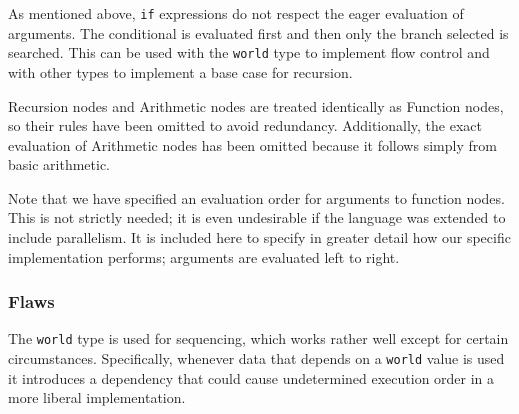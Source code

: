 \documentclass[12pt,UTF8,a4]{article}
\newcommand{\code}[1]{\texttt{#1}}
\newcommand{\type}[1]{\texttt{#1}}
\begin{document}
As mentioned above, \code{if} expressions do not respect the eager
evaluation of arguments. The conditional is evaluated first and then
only the branch selected is searched. This can be used with the
\type{world} type to implement flow control and with other types to
implement a base case for recursion.


Recursion nodes and Arithmetic nodes are treated identically as
Function nodes, so their rules have been omitted to avoid
redundancy. Additionally, the exact evaluation of Arithmetic nodes has
been omitted because it follows simply from basic arithmetic.

Note that we have specified an evaluation order for arguments to
function nodes. This is not strictly needed; it is even undesirable if
the language was extended to include parallelism. It is included here
to specify in greater detail how our specific implementation performs;
arguments are evaluated left to right.

\subsubsection{Flaws}
The \type{world} type is used for sequencing, which works rather well
except for certain circumstances. Specifically, whenever data that
depends on a \type{world} value is used it introduces a dependency
that could cause undetermined execution order in a more liberal
implementation.
\end{document}
